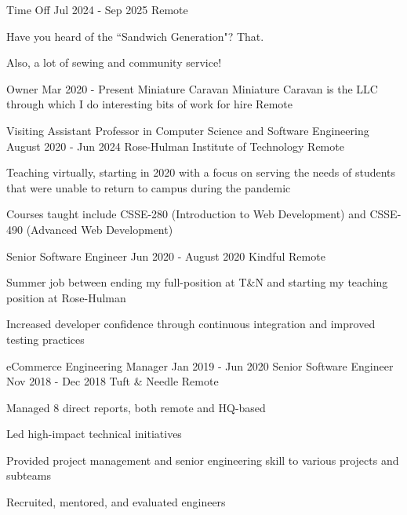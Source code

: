 

\begin{cventries}

  \cventry
  {Time Off}
  {Jul 2024 - Sep 2025}
  {}
  {Remote}
  {
    \begin{cvitems}
      \item Have you heard of the ``Sandwich Generation"? That.
      \item Also, a lot of sewing and community service!
    \end{cvitems}
  }

  \cventrywithorganizationnote
  {Owner}
  {Mar 2020 - Present}
  {Miniature Caravan}
  {Miniature Caravan is the LLC through which I do interesting bits of work for hire}
  {Remote}
  {  }

  \cventry
  {Visiting Assistant Professor in Computer Science and Software Engineering}
  {August 2020 - Jun 2024}
  {Rose-Hulman Institute of Technology}
  {Remote}
  {
    \begin{cvitems}
      \item Teaching virtually, starting in 2020 with a focus on serving the needs of students that were unable to return to campus during the pandemic
      \item Courses taught include CSSE-280 (Introduction to Web Development) and CSSE-490 (Advanced Web Development)
    \end{cvitems}
  }

  \cventry
  {Senior Software Engineer}
  {Jun 2020 - August 2020}
  {Kindful}
  {Remote}
  {
    \begin{cvitems}
      \item Summer job between ending my full-position at T\&N and starting my teaching position at Rose-Hulman
      \item Increased developer confidence through continuous integration and improved testing practices
    \end{cvitems}
  }

  \doublecventry
  {eCommerce Engineering Manager}
  {Jan 2019 - Jun 2020}
  {Senior Software Engineer}
  {Nov 2018 - Dec 2018}
  {Tuft \& Needle}
  {Remote}
  {
    \begin{cvitems}
      \item Managed 8 direct reports, both remote and HQ-based
      \item Led high-impact technical initiatives
      \item Provided project management and senior engineering skill to various projects and subteams
      \item Recruited, mentored, and evaluated engineers
    \end{cvitems}
  }


\end{cventries}

